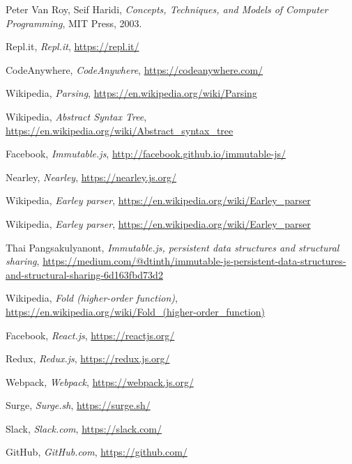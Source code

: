 \documentclass[a4paper,11pt]{article}
\begin{document}
\begin{thebibliography}{9}

Peter Van Roy, Seif Haridi,
\textit{Concepts, Techniques, and Models of Computer Programming},
MIT Press, 2003.

Repl.it,
\textit{Repl.it},
\url{https://repl.it/}

CodeAnywhere,
\textit{CodeAnywhere},
\url{https://codeanywhere.com/}

Wikipedia,
\textit{Parsing},
\url{https://en.wikipedia.org/wiki/Parsing}

Wikipedia,
\textit{Abstract Syntax Tree},
\url{https://en.wikipedia.org/wiki/Abstract_syntax_tree}

Facebook,
\textit{Immutable.js},
\url{http://facebook.github.io/immutable-js/}


Nearley,
\textit{Nearley},
\url{https://nearley.js.org/}


Wikipedia,
\textit{Earley parser},
\url{https://en.wikipedia.org/wiki/Earley_parser}

Wikipedia,
\textit{Earley parser},
\url{https://en.wikipedia.org/wiki/Earley_parser}

Thai Pangsakulyanont,
\textit{Immutable.js, persistent data structures and structural sharing},
\url{https://medium.com/@dtinth/immutable-js-persistent-data-structures-and-structural-sharing-6d163fbd73d2}

Wikipedia,
\textit{Fold (higher-order function)},
\url{https://en.wikipedia.org/wiki/Fold_(higher-order_function)}

Facebook,
\textit{React.js},
\url{https://reactjs.org/}

Redux,
\textit{Redux.js},
\url{https://redux.js.org/}

Webpack,
\textit{Webpack},
\url{https://webpack.js.org/}

Surge,
\textit{Surge.sh},
\url{https://surge.sh/}

Slack,
\textit{Slack.com},
\url{https://slack.com/}

GitHub,
\textit{GitHub.com},
\url{https://github.com/}


\end{thebibliography}
\end{document}
